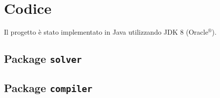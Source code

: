 \section{Codice}

Il progetto è stato implementato in Java\texttrademark{} utilizzando JDK 8 (Oracle$^{\text{®}}$).

\subsection{Package {\tt solver}}









\subsection{Package {\tt compiler}}





